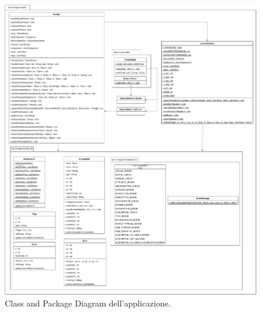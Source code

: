 \begin{figure}[h!]
	\centering
	\includegraphics[width=\textwidth]{./ImageFiles/class and package diagram.pdf}
	\caption{Class and Package Diagram dell'applicazione.}
	\label{fig:class_diagram}
\end{figure}


